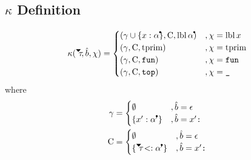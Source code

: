\documentclass{article}
\begin{document}
\begin{mathpar}
    
    
\end{mathpar}

\subsection*{$\kappa$ Definition}

$$
\kappa(\tauDownClosed, \hat{b},\chi) =
    \begin{cases}
        (\gamma \cup \{x:\alphaClosed\}, \C, \lbl \alphaClosed)     &, \chi = \lbl x \\
        (\gamma, \C, \tprim)                                        &, \chi = \tprim \\
        (\gamma, \C, \gtFun)                                        &, \chi = \gtFun \\
        (\gamma, \C, \gtTop)                                        &, \chi = \texttt{\char`\_}
    \end{cases}
$$
where
\begin{align*}
\gamma &=
    \begin{cases}
        \emptyset                                                   &, \hat{b} = \epsilon \\
        \{x':\alphaClosed'\}                                        &, \hat{b} = x'\texttt{:}
    \end{cases}\\
\C &=
    \begin{cases}
        \emptyset                                                   &, \hat{b} = \epsilon \\
        \{\tauDownClosed <: \alphaClosed'\}                         &, \hat{b} = x'\texttt{:}
    \end{cases}\\
\end{align*}
\end{document}
